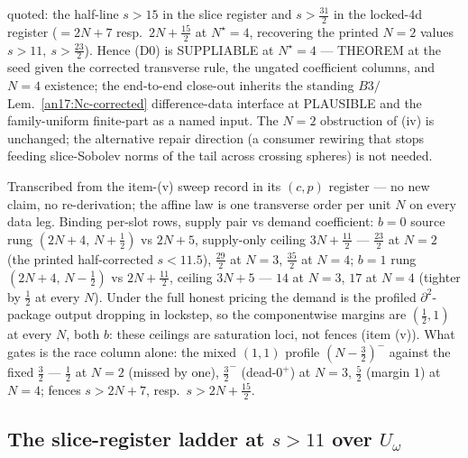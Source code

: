 \begin{remark}
\begin{enumerate}[label=\textup{(\roman*)},leftmargin=*,nosep]
  quoted: the half-line $s>15$ in the slice register and $s>\tfrac{31}2$ in the
  locked-4d register ($=2N+7$ resp.\ $2N+\tfrac{15}2$ at $N^\star{=}4$,
  recovering the printed $N{=}2$ values $s>11,\ s>\tfrac{23}2$). Hence (D0) is
  SUPPLIABLE at $N^\star{=}4$ --- THEOREM at the seed given the corrected
  transverse rule, the ungated coefficient columns, and $N{=}4$ existence; the
  end-to-end close-out inherits the standing $B3/$Lem.~\ref{an17:Nc-corrected}
  difference-data interface at PLAUSIBLE and the family-uniform finite-part as
  a named input. The $N{=}2$ obstruction of (iv) is unchanged; the alternative
  repair direction (a consumer rewiring that stops feeding slice-Sobolev norms
  of the tail across crossing spheres) is not needed.
\end{enumerate}
\end{remark}

\begin{remark}
Transcribed from the item-(v) sweep record in its $(c,p)$ register --- no new
claim, no re-derivation; the affine law is one transverse order per unit $N$ on
every data leg. Binding per-slot rows, supply pair vs demand coefficient:
$b{=}0$ source rung $(2N+4,\,N+\tfrac12)$ vs $2N+5$, supply-only ceiling
$3N+\tfrac{11}2$ --- $\tfrac{23}2$ at $N{=}2$ (the printed half-corrected
$s<11.5$), $\tfrac{29}2$ at $N{=}3$, $\tfrac{35}2$ at $N{=}4$; $b{=}1$ rung
$(2N+4,\,N-\tfrac12)$ vs $2N+\tfrac{11}2$, ceiling $3N+5$ --- $14$ at $N{=}3$,
$17$ at $N{=}4$ (tighter by $\tfrac12$ at every $N$). Under the full honest
pricing the demand is the profiled $\partial^2$-package output dropping in
lockstep, so the componentwise margins are $(\tfrac12,1)$ at every $N$, both
$b$: these ceilings are saturation loci, not fences (item (v)). What gates is
the race column alone: the mixed $(1,1)$ profile $(N-\tfrac32)^-$ against the
fixed $\tfrac32$ --- $\tfrac12$ at $N{=}2$ (missed by one), $\tfrac32^-$
(dead-$0^+$) at $N{=}3$, $\tfrac52$ (margin $1$) at $N{=}4$; fences $s>2N+7$,
resp.\ $s>2N+\tfrac{15}2$.
\end{remark}

\subsection{The slice-register ladder at \texorpdfstring{$s>11$}{s>11} over
\texorpdfstring{$U_\omega$}{U-omega}}\label{an17:sec-sliceladder}%

